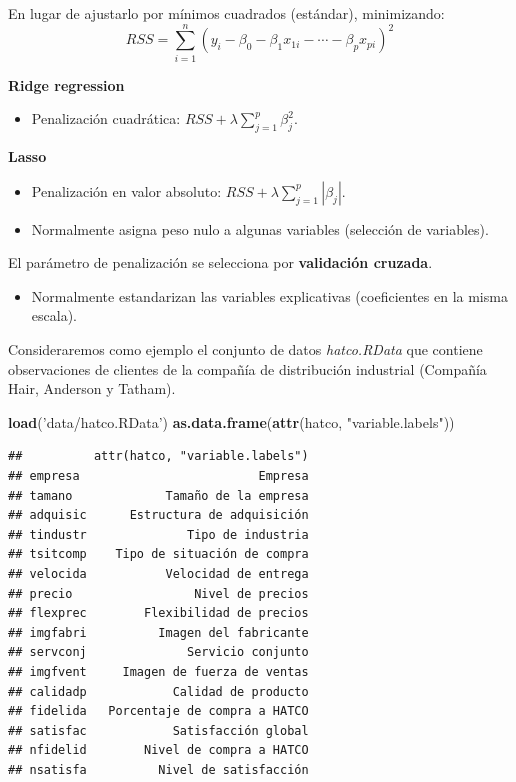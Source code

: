 \documentclass[]{book}
\newenvironment{Shaded}{\begin{snugshade}}{\end{snugshade}}
\newcommand{\KeywordTok}[1]{\textcolor[rgb]{0.13,0.29,0.53}{\textbf{#1}}}
\newcommand{\NormalTok}[1]{#1}
\newcommand{\StringTok}[1]{\textcolor[rgb]{0.31,0.60,0.02}{#1}}
\providecommand{\tightlist}{%
  \setlength{\itemsep}{0pt}\setlength{\parskip}{0pt}}
\begin{document}
En lugar de ajustarlo por mínimos cuadrados (estándar), minimizando:
\[ RSS = \sum\limits_{i=1}^{n}\left(  y_{i} - \beta_0 - \beta_1 x_{1i} - \cdots - \beta_p x_{pi} \right)^{2}\]

\textbf{Ridge regression}

\begin{itemize}
\tightlist
\item
  Penalización cuadrática: \(RSS+\lambda\sum_{j=1}^{p}\beta_{j}^{2}\).
\end{itemize}

\textbf{Lasso}

\begin{itemize}
\item
  Penalización en valor absoluto: \(RSS+\lambda\sum_{j=1}^{p}|\beta_{j}|\).
\item
  Normalmente asigna peso nulo a algunas variables
  (selección de variables).
\end{itemize}

El parámetro de penalización se selecciona por \textbf{validación cruzada}.

\begin{itemize}
\tightlist
\item
  Normalmente estandarizan las variables explicativas
  (coeficientes en la misma escala).
\end{itemize}

Consideraremos como ejemplo el conjunto de datos \emph{hatco.RData} que contiene
observaciones de clientes de la compañía de distribución industrial (Compañía
Hair, Anderson y Tatham).

\begin{Shaded}
\begin{Highlighting}[]
\KeywordTok{load}\NormalTok{(}\StringTok{'data/hatco.RData'}\NormalTok{)}
\KeywordTok{as.data.frame}\NormalTok{(}\KeywordTok{attr}\NormalTok{(hatco, }\StringTok{"variable.labels"}\NormalTok{))}
\end{Highlighting}
\end{Shaded}

\begin{verbatim}
##          attr(hatco, "variable.labels")
## empresa                         Empresa
## tamano             Tamaño de la empresa
## adquisic      Estructura de adquisición
## tindustr              Tipo de industria
## tsitcomp    Tipo de situación de compra
## velocida           Velocidad de entrega
## precio                 Nivel de precios
## flexprec        Flexibilidad de precios
## imgfabri          Imagen del fabricante
## servconj              Servicio conjunto
## imgfvent     Imagen de fuerza de ventas
## calidadp            Calidad de producto
## fidelida   Porcentaje de compra a HATCO
## satisfac            Satisfacción global
## nfidelid        Nivel de compra a HATCO
## nsatisfa          Nivel de satisfacción
\end{verbatim}
\end{document}
